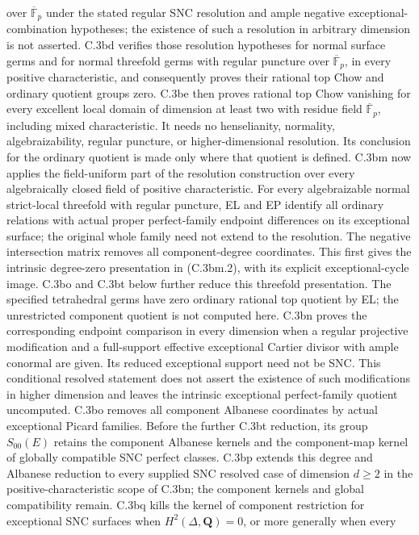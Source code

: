 over $\overline{\mathbb F}_p$ under the stated regular SNC
resolution and ample negative exceptional-combination hypotheses;
the existence of such a resolution in arbitrary dimension is
not asserted. C.3bd verifies those resolution hypotheses for
normal surface germs and for normal threefold germs with regular
puncture over $\overline{\mathbb F}_p$, in every positive
characteristic, and consequently proves their rational top
Chow and ordinary quotient groups zero.
C.3be then proves rational top Chow vanishing for every excellent
local domain of dimension at least two with residue
field $\overline{\mathbb F}_p$, including mixed characteristic.
It needs no henselianity, normality, algebraizability, regular puncture, or
higher-dimensional resolution. Its conclusion for the ordinary
quotient is made only where that quotient is defined.
C.3bm now applies the field-uniform part of the resolution construction
over every algebraically closed field of positive characteristic.
For every algebraizable normal strict-local threefold with regular puncture,
EL and EP identify all ordinary relations with actual proper perfect-family
endpoint differences on its exceptional surface; the original whole family
need not extend to the resolution. The negative intersection matrix removes
all component-degree coordinates. This first gives the intrinsic
degree-zero presentation in (C.3bm.2), with its explicit exceptional-cycle
image. C.3bo and C.3bt below further reduce this threefold presentation.
The specified tetrahedral germs have zero ordinary rational top quotient
by EL; the unrestricted component quotient is not computed here.
C.3bn proves the corresponding endpoint comparison in every dimension
when a regular projective modification and a full-support effective
exceptional Cartier divisor with ample conormal are given. Its reduced
exceptional support need not be SNC. This conditional resolved statement
does not assert the existence of such modifications in higher dimension
and leaves the intrinsic exceptional perfect-family quotient uncomputed.
C.3bo removes all component Albanese coordinates by actual exceptional
Picard families. Before the further C.3bt reduction, its group
$S_{00}(E)$ retains the component Albanese kernels and the component-map
kernel of globally compatible SNC perfect classes.
C.3bp extends this degree and Albanese reduction to every supplied SNC
resolved case of dimension $d\ge2$ in the positive-characteristic scope
of C.3bn; the component kernels and global compatibility remain.
C.3bq kills the kernel of component restriction for exceptional SNC
surfaces when $H^2(\Delta,\mathbf Q)=0$, or more generally when every
